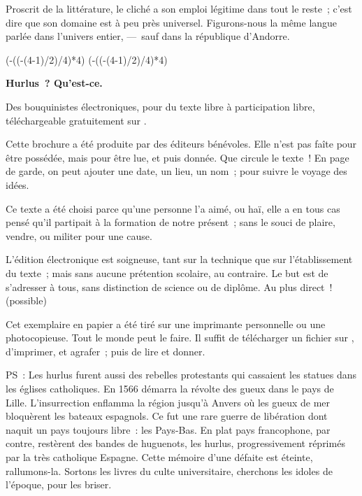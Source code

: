 \documentclass[french,twoside]{book} %
\newcommand\chapterclose{} %
\def\truncdiv#1#2{((#1-(#2-1)/2)/#2)}
\def\moduloop#1#2{(#1-\truncdiv{#1}{#2}*#2)}
\def\modulo#1#2{\number\numexpr\moduloop{#1}{#2}\relax}
\begin{document}
Proscrit de la littérature, le cliché a son emploi légitime dans tout le reste ; c’est dire que son domaine est à peu près universel. Figurons-nous la même langue parlée dans l’univers entier, — sauf dans la république d’Andorre.
\chapterclose

 


\ifbooklet
  \pagestyle{empty}
  \clearpage
  \ifnum\modulo{\value{page}}{4}=0 \hbox{}\newpage\hbox{}\newpage\fi
  \ifnum\modulo{\value{page}}{4}=1 \hbox{}\newpage\hbox{}\newpage\fi


  \hbox{}\newpage
  \ifodd\value{page}\hbox{}\newpage\fi
  {\centering\color{rubric}\bfseries\noindent\large
    Hurlus ? Qu’est-ce.\par
    \bigskip
  }
  \noindent Des bouquinistes électroniques, pour du texte libre à participation libre,
  téléchargeable gratuitement sur \href{https://hurlus.fr}{}.\par
  \bigskip
  \noindent Cette brochure a été produite par des éditeurs bénévoles.
  Elle n’est pas faîte pour être possédée, mais pour être lue, et puis donnée.
  Que circule le texte !
  En page de garde, on peut ajouter une date, un lieu, un nom ; pour suivre le voyage des idées.
  \par

  Ce texte a été choisi parce qu’une personne l’a aimé,
  ou haï, elle a en tous cas pensé qu’il partipait à la formation de notre présent ;
  sans le souci de plaire, vendre, ou militer pour une cause.
  \par

  L’édition électronique est soigneuse, tant sur la technique
  que sur l’établissement du texte ; mais sans aucune prétention scolaire, au contraire.
  Le but est de s’adresser à tous, sans distinction de science ou de diplôme.
  Au plus direct ! (possible)
  \par

  Cet exemplaire en papier a été tiré sur une imprimante personnelle
   ou une photocopieuse. Tout le monde peut le faire.
  Il suffit de
  télécharger un fichier sur \href{https://hurlus.fr}{},
  d’imprimer, et agrafer ; puis de lire et donner.\par

  \bigskip

  \noindent PS : Les hurlus furent aussi des rebelles protestants qui cassaient les statues dans les églises catholiques. En 1566 démarra la révolte des gueux dans le pays de Lille. L’insurrection enflamma la région jusqu’à Anvers où les gueux de mer bloquèrent les bateaux espagnols.
  Ce fut une rare guerre de libération dont naquit un pays toujours libre : les Pays-Bas.
  En plat pays francophone, par contre, restèrent des bandes de huguenots, les hurlus, progressivement réprimés par la très catholique Espagne.
  Cette mémoire d’une défaite est éteinte, rallumons-la. Sortons les livres du culte universitaire, cherchons les idoles de l’époque, pour les briser.
\fi
\end{document}
